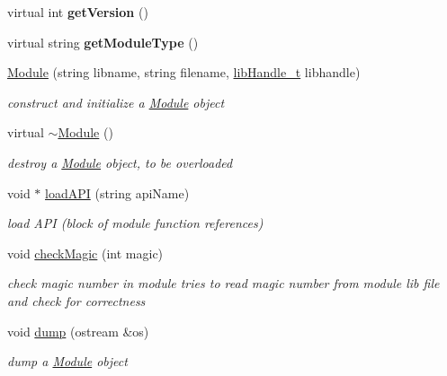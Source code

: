 \begin{DoxyCompactItemize}
virtual int {\bfseries get\+Version} ()
\item 
\mbox{\label{classModule_a0a0a9e897515df7ac9ab031015e3d352}} 
virtual string {\bfseries get\+Module\+Type} ()
\item 
\hyperlink{classModule_a431b07620991847651303e0f252e8285}{Module} (string libname, string filename, \hyperlink{Module_8h_acbeb44869400b78e5f4097d5c49fc093}{lib\+Handle\+\_\+t} libhandle)
\begin{DoxyCompactList}\small\item\em construct and initialize a \hyperlink{classModule}{Module} object \end{DoxyCompactList}\item 
\mbox{\label{classModule_a7c9d9c096786d127590fdd8aa2b7d681}} 
virtual \hyperlink{classModule_a7c9d9c096786d127590fdd8aa2b7d681}{$\sim$\+Module} ()
\begin{DoxyCompactList}\small\item\em destroy a \hyperlink{classModule}{Module} object, to be overloaded \end{DoxyCompactList}\item 
void $\ast$ \hyperlink{classModule_a4a9a9aa2518c2486e9bcb309277a1bf1}{load\+A\+PI} (string api\+Name)
\begin{DoxyCompactList}\small\item\em load A\+PI (block of module function references) \end{DoxyCompactList}\item 
void \hyperlink{classModule_a3394d69c34f70e6d54fcebcb22c2a2c2}{check\+Magic} (int magic)
\begin{DoxyCompactList}\small\item\em check magic number in module tries to read magic number from module lib file and check for correctness \end{DoxyCompactList}\item 
\mbox{\label{classModule_a6f0917a69ba21d691c6b20a65369c6c6}} 
void \hyperlink{classModule_a6f0917a69ba21d691c6b20a65369c6c6}{dump} (ostream \&os)
\begin{DoxyCompactList}\small\item\em dump a \hyperlink{classModule}{Module} object \end{DoxyCompactList}\end{DoxyCompactItemize}


